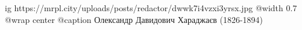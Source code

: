  
 
 
 
 

\ifcmt
  ig https://mrpl.city/uploads/posts/redactor/dwwk7i4vzxi3yrsx.jpg
  @width 0.7
	@wrap center
	@caption Олександр Давидович Хараджаєв (1826-1894)
\fi

